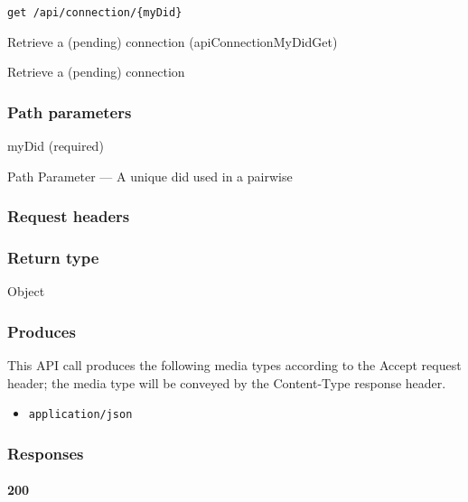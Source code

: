 \protect\hypertarget{apiConnectionMyDidGet}{}{}

\begin{verbatim}
get /api/connection/{myDid}
\end{verbatim}

Retrieve a (pending) connection ({apiConnectionMyDidGet})

Retrieve a (pending) connection

\hypertarget{path-parameters-83}{%
\subsubsection{Path parameters}\label{path-parameters-83}}

myDid (required)

{Path Parameter} --- A unique did used in a pairwise

\hypertarget{request-headers-80}{%
\subsubsection{Request headers}\label{request-headers-80}}

\hypertarget{return-type-117}{%
\subsubsection{Return type}\label{return-type-117}}

Object

\hypertarget{produces-149}{%
\subsubsection{Produces}\label{produces-149}}

This API call produces the following media types according to the
{Accept} request header; the media type will be conveyed by the
{Content-Type} response header.

\begin{itemize}
\tightlist
\item
  \texttt{application/json}
\end{itemize}

\hypertarget{responses-154}{%
\subsubsection{Responses}\label{responses-154}}

\hypertarget{section-496}{%
\paragraph{200}\label{section-496}}

